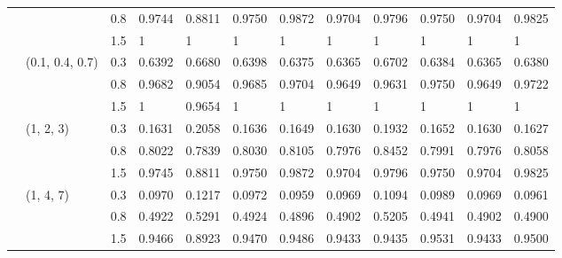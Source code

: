 \begin{table}[h]
\begin{tabular}{llllllllllll}
             		&                 	& 0.8 	& 0.9744  & 0.8811 	& 0.9750  	& 0.9872 	& 0.9704 	& 0.9796 	& 0.9750  	& 0.9704 	& 0.9825 \\
             		&                 	& 1.5 	& 1	  	& 1	 	& 1	  	& 1	 	& 1	 	& 1	 	& 1	  	& 1	 	& 1	        \\
             		& (0.1, 0.4, 0.7) & 0.3 	& 0.6392 	& 0.6680 	& 0.6398 	& 0.6375 	& 0.6365 	& 0.6702 	& 0.6384 	& 0.6365 	& 0.6380  \\
             		&                 	& 0.8 	& 0.9682 	& 0.9054 	& 0.9685 	& 0.9704 	& 0.9649 	& 0.9631 	& 0.9750  	& 0.9649 	& 0.9722 \\
             		&                 	& 1.5 	& 1	 	& 0.9654 	& 1	 	& 1	 	& 1	 	& 1	 	& 1	  	& 1	 	& 1		 \\
             		& (1, 2, 3)       	& 0.3 	& 0.1631 	& 0.2058 	& 0.1636 	& 0.1649 	& 0.1630  	& 0.1932 	& 0.1652 	& 0.1630  	& 0.1627 \\
             		&                 	& 0.8 	& 0.8022  & 0.7839 	& 0.8030  & 0.8105 	& 0.7976 	& 0.8452 	& 0.7991 	& 0.7976 	& 0.8058 \\
             		&                 	& 1.5 	& 0.9745  	& 0.8811 	& 0.9750  	& 0.9872 	& 0.9704 	& 0.9796 	& 0.9750  	& 0.9704 	& 0.9825 \\
             		& (1, 4, 7)      	& 0.3 	& 0.0970 	& 0.1217 	& 0.0972 	& 0.0959 	& 0.0969 	& 0.1094 	& 0.0989 	& 0.0969 	& 0.0961 \\
             		&                 	& 0.8 	& 0.4922 	& 0.5291 	& 0.4924 	& 0.4896 	& 0.4902 	& 0.5205 	& 0.4941 	& 0.4902 	& 0.4900   \\
             		&                 	& 1.5 	& 0.9466  & 0.8923 	& 0.9470  	& 0.9486 	& 0.9433 	& 0.9435 	& 0.9531 	& 0.9433 	& 0.9500  \\\toprule
\end{tabular}
\label{tab1}
\end{table}

